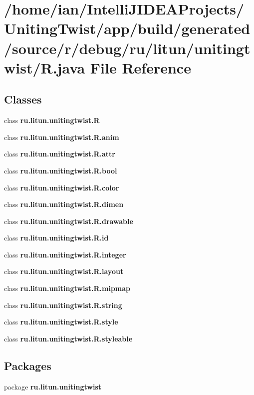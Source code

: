 \section{/home/ian/\+Intelli\+J\+I\+D\+E\+A\+Projects/\+Uniting\+Twist/app/build/generated/source/r/debug/ru/litun/unitingtwist/R.java File Reference}
\label{ru_2litun_2unitingtwist_2_r_8java}
\subsection*{Classes}
\begin{DoxyCompactItemize}
\item 
class \textbf{ ru.\+litun.\+unitingtwist.\+R}
\item 
class {\bfseries ru.\+litun.\+unitingtwist.\+R.\+anim}
\item 
class {\bfseries ru.\+litun.\+unitingtwist.\+R.\+attr}
\item 
class {\bfseries ru.\+litun.\+unitingtwist.\+R.\+bool}
\item 
class {\bfseries ru.\+litun.\+unitingtwist.\+R.\+color}
\item 
class {\bfseries ru.\+litun.\+unitingtwist.\+R.\+dimen}
\item 
class {\bfseries ru.\+litun.\+unitingtwist.\+R.\+drawable}
\item 
class {\bfseries ru.\+litun.\+unitingtwist.\+R.\+id}
\item 
class {\bfseries ru.\+litun.\+unitingtwist.\+R.\+integer}
\item 
class {\bfseries ru.\+litun.\+unitingtwist.\+R.\+layout}
\item 
class {\bfseries ru.\+litun.\+unitingtwist.\+R.\+mipmap}
\item 
class {\bfseries ru.\+litun.\+unitingtwist.\+R.\+string}
\item 
class {\bfseries ru.\+litun.\+unitingtwist.\+R.\+style}
\item 
class {\bfseries ru.\+litun.\+unitingtwist.\+R.\+styleable}
\end{DoxyCompactItemize}
\subsection*{Packages}
\begin{DoxyCompactItemize}
\item 
package \textbf{ ru.\+litun.\+unitingtwist}
\end{DoxyCompactItemize}
